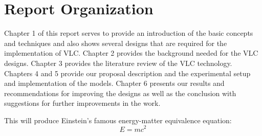 
\section{Report Organization}

Chapter 1 of this report serves to provide an introduction of the basic concepts and techniques and also shows several designs that are required for the implementation of VLC. Chapter 2 provides the background needed for the VLC
designs. Chapter 3 provides the literature review of the VLC technology. Chapters 4 and
5 provide our proposal description and the experimental setup and implementation of the models. Chapter 6 presents
our results and recommendations for improving the designs as well as the conclusion with suggestions
for further improvements in the work. 

This will produce Einstein's famous energy-matter equivalence equation:
\begin{equation}
E = mc^{2}
\label{eqn:Einstein}
\end{equation}
